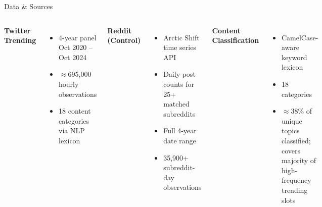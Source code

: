 \documentclass[aspectratio=169]{beamer}
\begin{document}
\begin{frame}{Data \& Sources}
\begin{columns}[t]
    \textbf{\textcolor{utepblue}{Twitter Trending}}
    \begin{itemize}
        \item 4-year panel\\Oct 2020 – Oct 2024
        \item $\approx$695,000 hourly observations
        \item 18 content categories via NLP lexicon
    \end{itemize}

    \textbf{\textcolor{utepblue}{Reddit (Control)}}
    \begin{itemize}
        \item Arctic Shift time series API
        \item Daily post counts for 25+ matched subreddits
        \item Full 4-year date range
        \item 35,900+ subreddit-day observations
    \end{itemize}

    \textbf{\textcolor{utepblue}{Content Classification}}
    \begin{itemize}
        \item CamelCase-aware keyword lexicon
        \item 18 categories
        \item $\approx$38\% of unique topics classified; covers majority of high-frequency trending slots
    \end{itemize}
\end{columns}
\end{frame}
\end{document}
